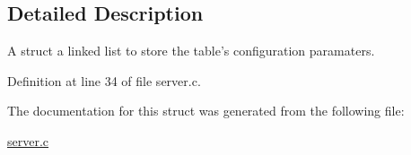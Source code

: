 \subsection{Detailed Description}
A struct a linked list to store the table's configuration paramaters. 

Definition at line 34 of file server.c.



The documentation for this struct was generated from the following file:\begin{DoxyCompactItemize}
\item 
\hyperlink{server_8c}{server.c}\end{DoxyCompactItemize}
